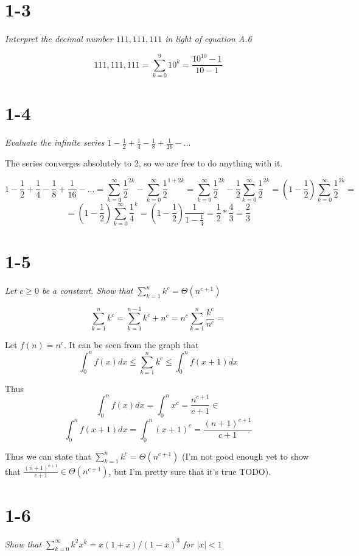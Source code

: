\documentclass[11pt,oneside,titlepage]{book}
\begin{document}
\section*{1-3}
\textit{Interpret the decimal number $111,111,111$ in light of equation A.6}

$$111,111,111 = \sum_{k = 0}^{9}{10^k} = \frac{10^{10} - 1}{10 - 1}$$

\section*{1-4}
\textit{Evaluate the infinite series $1 - \frac 1 2 + \frac 1 4 - \frac 1 8
  + \frac{1}{16} - ...$}

The series converges absolutely to 2, so we are free to do anything with it.

$$1 - \frac 1 2 + \frac 1 4 - \frac 1 8
+ \frac{1}{16} - ... = 
\sum_{k = 0}^{\infty}{\frac{1}{2}^{2k}}
- \sum_{k = 0}^{\infty}{\frac{1}{2}^{1 + 2k}} =
\sum_{k = 0}^{\infty}{\frac{1}{2}^{2k}}
- \frac{1}{2}\sum_{k = 0}^{\infty}{\frac{1}{2}^{2k}} =
\left(1 - \frac{1}{2}\right)\sum_{k = 0}^{\infty}{\frac{1}{2}^{2k}} = 
$$
$$
= \left(1 - \frac{1}{2}\right)\sum_{k = 0}^{\infty}{\frac{1}{4}^{k}}
= \left(1 - \frac{1}{2}\right)\frac{1}{1 - \frac{1}{4}}
= \frac 1 2 *  \frac 4 3 = \frac 2 3
$$

\section*{1-5}
\textit{Let $c \geq 0$ be a constant. Show that
  $\sum_{k = 1}^{n}{k^c} = \Theta(n^{c + 1})$}

$$
\sum_{k = 1}^{n}{k^c} = \sum_{k = 1}^{n - 1}{k^c} + n^c =
n^c\sum_{k = 1}^{n}{\frac{k^c}{n^c}} =
$$

Let $f(n) = n^c$.
It can be seen from the graph that
$$\int_{0}^{n}{f(x)dx} \leq \sum_{k = 1}^{n}{k^c} \leq
\int_{0}^{n}{f(x + 1)dx}$$

Thus 
$$\int_0^n{f(x)dx} = \int_0^n{x^c} = \frac{n^{c + 1}}{c + 1} \in$$
$$\int_0^n{f(x + 1)dx} = \int_0^n{(x + 1)^c} = \frac{(n + 1)^{c + 1}}{c + 1}$$

Thus we can state that $\sum_{k = 1}^{n}{k^c} = \Theta(n^{c + 1})$
(I'm not good enough yet to show that $\frac{(n + 1)^{c + 1}}{c + 1} \in
\Theta(n^{c + 1})$, but I'm pretty sure that it's true TODO).



\section*{1-6}
\textit{Show that $\sum_{k=0}^{\infty}{k^2 x^k} = x(1 + x)/(1 - x)^3$ for
  $|x| < 1$}
\end{document}

